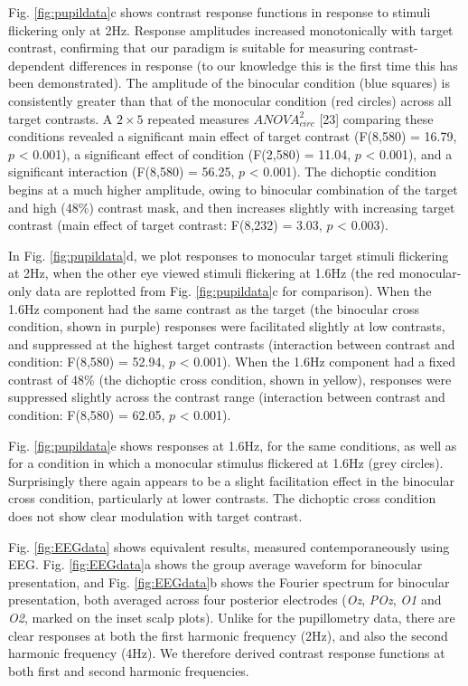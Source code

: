 \documentclass[
]{article}
\begin{document}
Fig. \ref{fig:pupildata}c shows contrast response functions in response to stimuli flickering only at 2Hz. Response amplitudes increased monotonically with target contrast, confirming that our paradigm is suitable for measuring contrast-dependent differences in response (to our knowledge this is the first time this has been demonstrated). The amplitude of the binocular condition (blue squares) is consistently greater than that of the monocular condition (red circles) across all target contrasts. A \(2\times5\) repeated measures \(ANOVA^2_{circ}\) {[}23{]} comparing these conditions revealed a significant main effect of target contrast (F(8,580) = 16.79, \(p\) \textless{} 0.001), a significant effect of condition (F(2,580) = 11.04, \(p\) \textless{} 0.001), and a significant interaction (F(8,580) = 56.25, \(p\) \textless{} 0.001). The dichoptic condition begins at a much higher amplitude, owing to binocular combination of the target and high (48\%) contrast mask, and then increases slightly with increasing target contrast (main effect of target contrast: F(8,232) = 3.03, \(p\) \textless{} 0.003).

In Fig. \ref{fig:pupildata}d, we plot responses to monocular target stimuli flickering at 2Hz, when the other eye viewed stimuli flickering at 1.6Hz (the red monocular-only data are replotted from Fig. \ref{fig:pupildata}c for comparison). When the 1.6Hz component had the same contrast as the target (the binocular cross condition, shown in purple) responses were facilitated slightly at low contrasts, and suppressed at the highest target contrasts (interaction between contrast and condition: F(8,580) = 52.94, \(p\) \textless{} 0.001). When the 1.6Hz component had a fixed contrast of 48\% (the dichoptic cross condition, shown in yellow), responses were suppressed slightly across the contrast range (interaction between contrast and condition: F(8,580) = 62.05, \(p\) \textless{} 0.001).

Fig. \ref{fig:pupildata}e shows responses at 1.6Hz, for the same conditions, as well as for a condition in which a monocular stimulus flickered at 1.6Hz (grey circles). Surprisingly there again appears to be a slight facilitation effect in the binocular cross condition, particularly at lower contrasts. The dichoptic cross condition does not show clear modulation with target contrast.

Fig. \ref{fig:EEGdata} shows equivalent results, measured contemporaneously using EEG. Fig. \ref{fig:EEGdata}a shows the group average waveform for binocular presentation, and Fig. \ref{fig:EEGdata}b shows the Fourier spectrum for binocular presentation, both averaged across four posterior electrodes (\emph{Oz}, \emph{POz}, \emph{O1} and \emph{O2}, marked on the inset scalp plots). Unlike for the pupillometry data, there are clear responses at both the first harmonic frequency (2Hz), and also the second harmonic frequency (4Hz). We therefore derived contrast response functions at both first and second harmonic frequencies.
\end{document}
